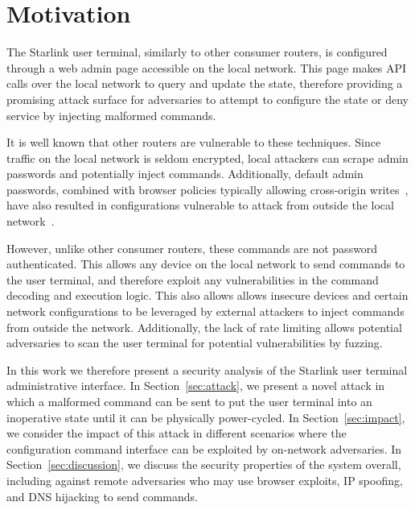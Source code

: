 \section{Motivation}\label{sec:motivation}

The Starlink user terminal, similarly to other consumer routers, is configured through a web admin page accessible on the local network.
This page makes API calls over the local network to query and update the state, therefore providing a promising attack surface for adversaries to attempt to configure the state or deny service by injecting malformed commands.

It is well known that other routers are vulnerable to these techniques.
Since traffic on the local network is seldom encrypted, local attackers can scrape admin passwords and potentially inject commands.
Additionally, default admin passwords, combined with browser policies typically allowing cross-origin writes~\cite{same_origin_policy}, have also resulted in configurations vulnerable to attack from outside the local network~\cite{drive_by_pharming}.

However, unlike other consumer routers, these commands are not password authenticated.
This allows any device on the local network to send commands to the user terminal, and therefore exploit any vulnerabilities in the command decoding and execution logic.
This also allows allows insecure devices and certain network configurations to be leveraged by external attackers to inject commands from outside the network.
Additionally, the lack of rate limiting allows potential adversaries to scan the user terminal for potential vulnerabilities by fuzzing.

In this work we therefore present a security analysis of the Starlink user terminal administrative interface.
In Section~\ref{sec:attack}, we present a novel attack in which a malformed command can be sent to put the user terminal into an inoperative state until it can be physically power-cycled.
In Section~\ref{sec:impact}, we consider the impact of this attack in different scenarios where the configuration command interface can be exploited by on-network adversaries.
In Section~\ref{sec:discussion}, we discuss the security properties of the system overall, including against remote adversaries who may use browser exploits, IP spoofing, and DNS hijacking to send commands.
